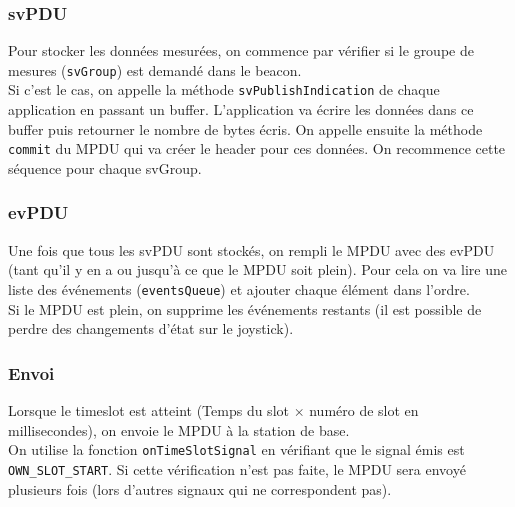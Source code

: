 \documentclass[DeseNET_Sebastien_Deriaz]{subfiles}
\begin{document}
\subsubsection{svPDU}
Pour stocker les données mesurées, on commence par vérifier si le groupe de mesures (\verb!svGroup!) est demandé dans le beacon.\\
Si c'est le cas, on appelle la méthode \verb!svPublishIndication! de chaque application en passant un buffer. L'application va écrire les données dans ce buffer puis retourner le nombre de bytes écris. On appelle ensuite la méthode \verb!commit! du MPDU qui va créer le header pour ces données. On recommence cette séquence pour chaque svGroup.
\subsubsection{evPDU}
Une fois que tous les svPDU sont stockés, on rempli le MPDU avec des evPDU (tant qu'il y en a ou jusqu'à ce que le MPDU soit plein). Pour cela on va lire une liste des événements (\verb!eventsQueue!) et ajouter chaque élément dans l'ordre.\\
Si le MPDU est plein, on supprime les événements restants (il est possible de perdre des changements d'état sur le joystick).
\subsubsection{Envoi}
Lorsque le timeslot est atteint (Temps du slot $\times$ numéro de slot en millisecondes), on envoie le MPDU à la station de base.\\
On utilise la fonction \verb!onTimeSlotSignal! en vérifiant que le signal émis est \verb!OWN_SLOT_START!. Si cette vérification n'est pas faite, le MPDU sera envoyé plusieurs fois (lors d'autres signaux qui ne correspondent pas).
\pagebreak
\end{document}

